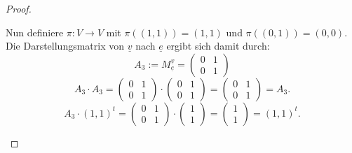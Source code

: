 \documentclass{article}
\begin{document}
\begin{proof}
\begin{enumerate}
        Nun definiere $\pi: V \to V$ mit $\pi((1,1)) = (1,1)$ und
        $\pi((0,1)) = (0,0)$. Die Darstellungsmatrix von $\underline{v}$
        nach  $\underline{e}$ ergibt sich damit durch:
         \[
             A_3 := M_{\underline{e}}^{\underline{v}} = \begin{pmatrix} 0 & 1 \\ 0 & 1 \end{pmatrix}
        \]
        \[
            A_3 \cdot A_3 = \begin{pmatrix} 0 & 1 \\ 0 & 1 \end{pmatrix} 
            \cdot \begin{pmatrix}  0 & 1 \\ 0 & 1\end{pmatrix} 
            = \begin{pmatrix} 0 & 1 \\ 0 & 1 \end{pmatrix}  = A_3
        .\]
        \[
        A_3 \cdot (1,1)^{t} = \begin{pmatrix} 0 & 1 \\ 0 & 1 \end{pmatrix} 
        \cdot \begin{pmatrix} 1 \\ 1 \end{pmatrix} 
        = \begin{pmatrix} 1 \\ 1 \end{pmatrix}  = (1,1)^{t}
        .\] 
\end{enumerate}
\end{proof}
\end{document}
